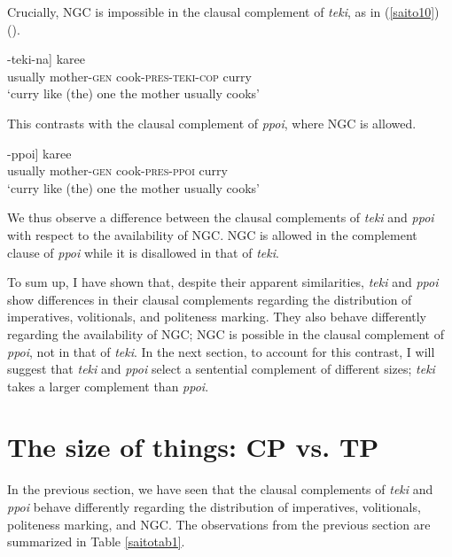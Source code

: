 \documentclass[output=paper]{langscibook}
\begin{document}
Crucially, NGC is impossible in the clausal complement of \emph{teki}, as in (\ref{saito10}) (\citealt{Saito2017}).

\begin{exe}
\ex \label{saito10}
\gll *[[{hudan} {okaasan-no} {tuku-ru}]-{teki-na}] {karee}\\
usually mother-\textsc{gen} cook-\textsc{pres-teki-cop} curry\\ 
\glt ‘curry like (the) one the mother usually cooks’
\end{exe}

This contrasts with the clausal complement of \emph{ppoi}, where NGC is allowed.

\begin{exe}
\ex \label{saito11}
\gll [[{hudan} {okaasan-no} {tuku-ru}]-{ppoi}] {karee}\\
usually mother-\textsc{gen} cook-\textsc{pres-ppoi} curry\\ 
\glt ‘curry like (the) one the mother usually cooks’
\end{exe}

We thus observe a difference between the clausal complements of \emph{teki} and \emph{ppoi} with respect to the availability of NGC. NGC is allowed in the complement clause of \emph{ppoi} while it is disallowed in that of \emph{teki}.

To sum up, I have shown that, despite their apparent similarities, \emph{teki} and \emph{ppoi} show differences in their clausal complements regarding the distribution of imperatives, volitionals, and politeness marking. They also behave differently regarding the availability of NGC; NGC is possible in the clausal complement of \emph{ppoi}, not in that of \emph{teki}. In the next section, to account for this contrast, I will suggest that \emph{teki} and \emph{ppoi} select a sentential complement of different sizes; \emph{teki} takes a larger complement than \emph{ppoi}.

\section{The size of things: CP vs. TP} \label{saitos3}

In the previous section, we have seen that the clausal complements of \emph{teki} and \emph{ppoi} behave differently regarding the distribution of imperatives, volitionals, politeness marking, and NGC. The observations from the previous section are summarized in Table \ref{saitotab1}.
\end{document}
